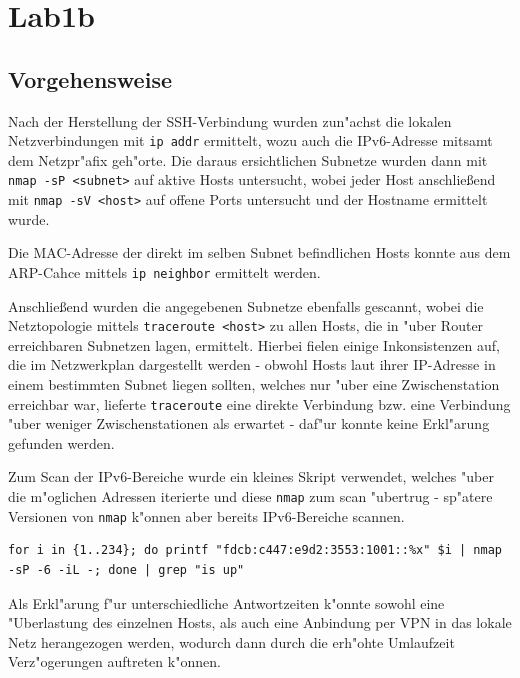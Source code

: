 \documentclass[12pt,a4paper,titlepage,oneside]{scrartcl}
\begin{document}
\section{Lab1b}

\subsection{Vorgehensweise}
Nach der Herstellung der SSH-Verbindung wurden zun"achst die lokalen Netzverbindungen mit \texttt{ip addr} ermittelt, wozu auch die IPv6-Adresse mitsamt dem Netzpr"afix geh"orte. Die daraus ersichtlichen Subnetze wurden dann mit \texttt{nmap -sP <subnet>} auf aktive Hosts untersucht, wobei jeder Host anschließend mit \texttt{nmap -sV <host>} auf offene Ports untersucht und der Hostname ermittelt wurde.

Die MAC-Adresse der direkt im selben Subnet befindlichen Hosts konnte aus dem ARP-Cahce mittels \texttt{ip neighbor} ermittelt werden.

Anschließend wurden die angegebenen Subnetze ebenfalls gescannt, wobei die Netztopologie mittels \texttt{traceroute <host>} zu allen Hosts, die in "uber Router erreichbaren Subnetzen lagen, ermittelt. Hierbei fielen einige Inkonsistenzen auf, die im Netzwerkplan dargestellt werden - obwohl Hosts laut ihrer IP-Adresse in einem bestimmten Subnet liegen sollten, welches nur "uber eine Zwischenstation erreichbar war, lieferte \texttt{traceroute} eine direkte Verbindung bzw. eine Verbindung "uber weniger Zwischenstationen als erwartet - daf"ur konnte keine Erkl"arung gefunden werden.

Zum Scan der IPv6-Bereiche wurde ein kleines Skript verwendet, welches "uber die m"oglichen Adressen iterierte und diese \texttt{nmap} zum scan "ubertrug - sp"atere Versionen von \texttt{nmap} k"onnen aber bereits IPv6-Bereiche scannen.
\begin{lstlisting}[caption=IPv6 Skript Beispiel,label=code:ipv6,style=simple]
for i in {1..234}; do printf "fdcb:c447:e9d2:3553:1001::%x" $i | nmap -sP -6 -iL -; done | grep "is up"
\end{lstlisting}

Als Erkl"arung f"ur unterschiedliche Antwortzeiten k"onnte sowohl eine "Uberlastung des einzelnen Hosts, als auch eine Anbindung per VPN in das lokale Netz herangezogen werden, wodurch dann durch die erh"ohte Umlaufzeit Verz"ogerungen auftreten k"onnen.
\end{document}
